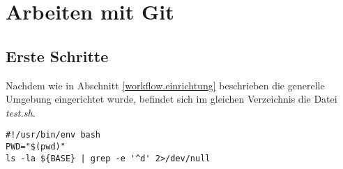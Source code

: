 \section{Arbeiten mit Git}

\subsection{Erste Schritte}
Nachdem wie in Abschnitt \ref{workflow.einrichtung} beschrieben die generelle Umgebung eingerichtet wurde, befindet sich im gleichen Verzeichnis die Datei \textit{test.sh}.

\begin{verbatim}
#!/usr/bin/env bash
PWD="$(pwd)"
ls -la ${BASE} | grep -e '^d' 2>/dev/null
\end{verbatim}

